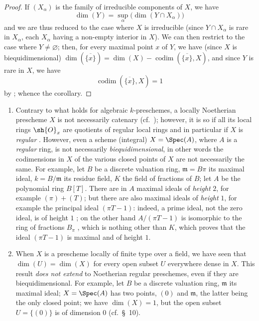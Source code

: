 \begin{proof}
If $(X_\alpha)$ is the family of irreducible components of $X$, we have
\[
  \dim(Y) = \sup_\alpha\big(\dim(Y\cap X_\alpha)\big)
\]
and we are thus reduced to the case where $X$ is irreducible (since $Y\cap X_\alpha$ is rare in $X_\alpha$, each $X_\alpha$ having a non-empty interior in $X$).
We can then restrict to the case where $Y\neq\varnothing$; then, for every maximal point $x$ of $Y$, we have (since $X$ is biequidimensional) $\dim(\overline{\{x\}})=\dim(X)-\operatorname{codim}(\overline{\{x\}},X)$, and since $Y$ is rare in $X$, we have
\[
  \operatorname{codim}(\overline{\{x\}},X) = 1
\]
by ; whence the corollary.
\end{proof}

\begin{remarks}[5.2.5]
\label{IV.5.2.5}
\begin{enumerate}[label=(\roman*)]
  \item Contrary to what holds for algebraic $k$-preschemes, a locally Noetherian prescheme $X$ is not necessarily catenary (cf.\ ); however, it is so if all its local rings $\sh{O}_x$ are quotients of regular local rings  and in particular if $X$ is \emph{regular} .
However, even a scheme (integral) $X=\Spec(A)$, where $A$ is a \emph{regular} ring, is not necessarily \emph{biequidimensional}, in other words  the codimensions in $X$ of the various closed points of $X$ are not necessarily the same.
For example, let $B$ be a discrete valuation ring, $\mathfrak{m}=B\pi$ its maximal ideal, $k=B/\mathfrak{m}$ its residue field, $K$ the field of fractions of $B$; let $A$ be the polynomial ring $B[T]$.
There are in $A$ maximal ideals of \emph{height} $2$, for example $(\pi)+(T)$; but there are also maximal ideals of \emph{height} $1$, for example the principal ideal $(\pi T-1)$: indeed, a prime ideal, not the zero ideal, is of height $1$ ; on the other hand $A/(\pi T-1)$ is isomorphic to the ring of fractions $B_\pi$ , which is nothing other than $K$, which proves that the ideal $(\pi T-1)$ is maximal and of height $1$.
  \item When $X$ is a prescheme locally of finite type over a field, we have seen  that $\dim(U)=\dim(X)$ for every open subset $U$ everywhere dense in $X$.
This result \emph{does not extend} to Noetherian regular preschemes, even if they are biequidimensional.
For example, let $B$ be a discrete valuation ring, $\mathfrak{m}$ its maximal ideal; $X=\Spec(A)$ has two points, $(0)$ and $\mathfrak{m}$, the latter being the only closed point; we have $\dim(X)=1$, but the open subset $U=\{(0)\}$ is of dimension $0$ (cf.\ \S~10).
\end{enumerate}
\end{remarks}

